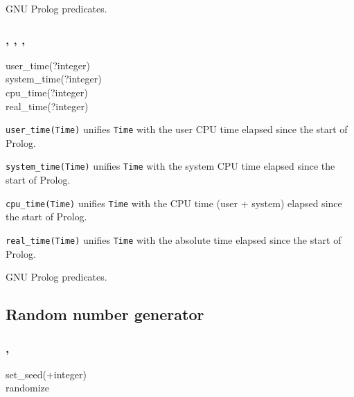 \Portability

GNU Prolog predicates.

\subsubsection{,\label{user-time/1}
               ,
               ,
               }

\begin{TemplatesOneCol}
user\_time(?integer)\\
system\_time(?integer)\\
cpu\_time(?integer)\\
real\_time(?integer)

\end{TemplatesOneCol}

\Description

\texttt{user\_time(Time)} unifies \texttt{Time} with the user
CPU time elapsed since the start of Prolog.

\texttt{system\_time(Time)} unifies \texttt{Time} with the
system CPU time elapsed since the start of Prolog.

\texttt{cpu\_time(Time)} unifies \texttt{Time} with the CPU
time (user + system) elapsed since the start of Prolog.

\texttt{real\_time(Time)} unifies \texttt{Time} with the
absolute time elapsed since the start of Prolog.

\begin{PlErrors}


\end{PlErrors}

\Portability

GNU Prolog predicates.

\subsection{Random number generator}

\subsubsection{,
               }

\begin{TemplatesOneCol}
set\_seed(+integer)\\
randomize

\end{TemplatesOneCol}

